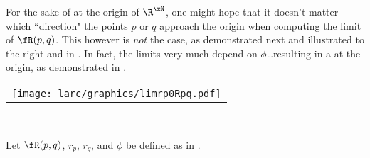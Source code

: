 \begin{minipage}{\tw-60mm}
  For the sake of  at the origin of $\R^\xN$, one might hope that 
  it doesn't matter which ``direction" the points $p$ or $q$ approach the origin
  when computing the limit of $\fR(p,q)$.
  This however is \emph{not} the case, as demonstrated next and illustrated to the right and in .
  In fact, the limits very much depend on $\phi$\ldots resulting in a  at the origin,
  as demonstrated in .
\end{minipage}\hfill%
\begin{tabular}{c}\texttt{[image: larc/graphics/limrp0Rpq.pdf]}\end{tabular}\\
\begin{proposition}
\label{prop:larcR_rp0}
Let $\fR(p,q)$, $r_p$, $r_q$, and $\phi$ be defined as in .
\end{proposition}
